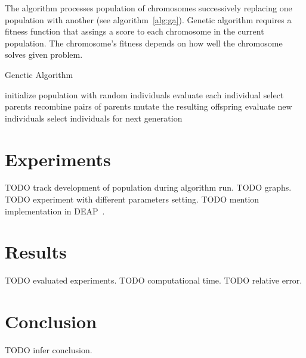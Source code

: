 \documentclass{article}
\begin{document}
The algorithm processes population of chromosomes successively replacing
one population with another (see algorithm~\ref{alg:ga}).
Genetic algorithm requires a fitness function that assings a score to
each chromosome in the current population.
The chromosome's fitness depends on how well the chromosome solves given
problem.
\cite{mitchell1996}

\begin{algorithm}[hb]
\caption{Genetic Algorithm~\cite{eiben2003}}
\label{alg:ga}
\begin{algorithmic}
\STATE initialize population with random individuals
\STATE evaluate each individual
\STATE select parents
\STATE recombine pairs of parents
\STATE mutate the resulting offspring
\STATE evaluate new individuals
\STATE select individuals for next generation
\ENDWHILE
\end{algorithmic}
\end{algorithm}

\section{Experiments}

TODO track development of population during algorithm run.
TODO graphs.
TODO experiment with different parameters setting.
TODO mention implementation in DEAP~\cite{fortin2012}.

\section{Results}

TODO evaluated experiments.
TODO computational time.
TODO relative error.

\section{Conclusion}

TODO infer conclusion.




\end{document}
